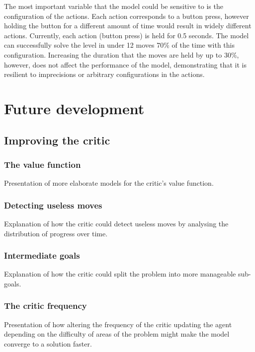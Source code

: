 \documentclass[10pt]{article}
\begin{document}
    The most important variable that the model could be sensitive to is the configuration of the actions. Each action corresponds to a button press, however holding the button for a different amount of time would result in widely different actions. Currently, each action (button press) is held for 0.5 seconds. The model can successfully solve the level in under 12 moves 70\% of the time with this configuration. Increasing the duration that the moves are held by up to 30\%, however, does not affect the performance of the model, demonstrating that it is resilient to imprecisions or arbitrary configurations in the actions.

    \section{Future development}

    \subsection{Improving the critic}

    \subsubsection{The value function}

    Presentation of more elaborate models for the critic's value function.

    \subsubsection{Detecting useless moves}

    Explanation of how the critic could detect useless moves by analysing the distribution of progress over time.

    \subsubsection{Intermediate goals}

    Explanation of how the critic could split the problem into more manageable sub-goals.

    \subsubsection{The critic frequency}

    Presentation of how altering the frequency of the critic updating the agent depending on the difficulty of areas of the problem might make the model converge to a solution faster.
\end{document}

